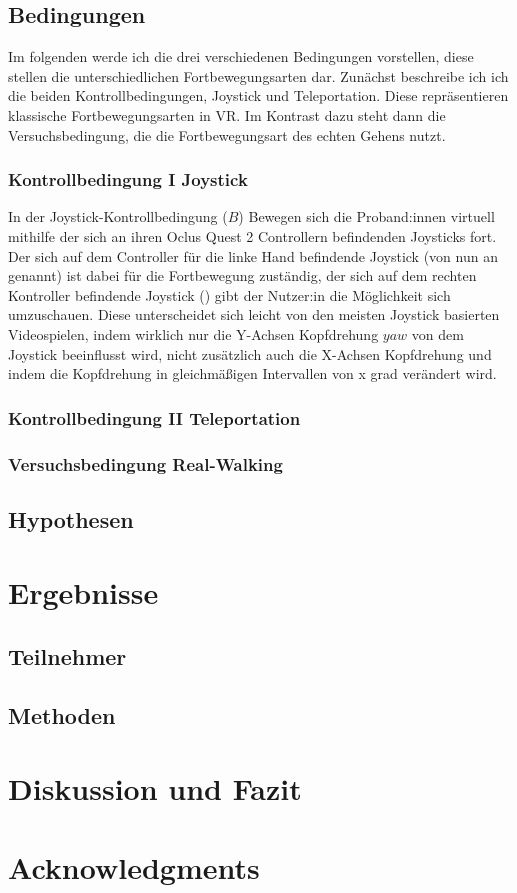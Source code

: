     \section{Bedingungen}\label{sec:conditions}
        Im folgenden werde ich die drei verschiedenen Bedingungen vorstellen, diese stellen die unterschiedlichen Fortbewegungsarten dar. Zunächst beschreibe ich ich die beiden Kontrollbedingungen, Joystick und Teleportation. Diese repräsentieren klassische Fortbewegungsarten in VR. Im Kontrast dazu steht dann die Versuchsbedingung, die die Fortbewegungsart des echten Gehens nutzt.

        \subsection{Kontrollbedingung I Joystick}\label{subsec:joystick}
            In der Joystick-Kontrollbedingung ($B$) Bewegen sich die Proband:innen virtuell mithilfe der sich an ihren Oclus Quest 2 Controllern befindenden Joysticks fort. %
            Der sich auf dem Controller für die linke Hand befindende Joystick (von nun an  genannt) ist dabei für die Fortbewegung zuständig, der sich auf dem rechten Kontroller befindende Joystick () gibt der Nutzer:in die Möglichkeit sich umzuschauen. Diese unterscheidet sich leicht von den meisten Joystick basierten Videospielen, indem wirklich nur die Y-Achsen Kopfdrehung $yaw$ von dem Joystick beeinflusst wird, nicht zusätzlich auch die X-Achsen Kopfdrehung und indem die Kopfdrehung in gleichmäßigen Intervallen von x grad %
            verändert wird. %



        \subsection{Kontrollbedingung II Teleportation}\label{subsec:teleport}
        \subsection{Versuchsbedingung Real-Walking}\label{subsec:realwalk}
    \section{Hypothesen}\label{}

\chapter{Ergebnisse}\label{}
    \section{Teilnehmer}\label{}
    \section{Methoden}\label{}

\chapter{Diskussion und Fazit}\label{}

\chapter{Acknowledgments}\label{}



